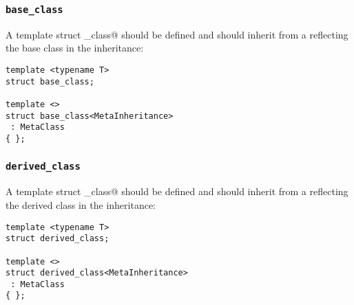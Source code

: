 \subsubsection{\texttt{base\_class}}

A template struct \verb@base_class@ should be defined and should inherit from
a  reflecting the base class in the inheritance:

\begin{verbatim}
template <typename T>
struct base_class;

template <>
struct base_class<MetaInheritance>
 : MetaClass
{ };
\end{verbatim}

\subsubsection{\texttt{derived\_class}}

A template struct \verb@derived_class@ should be defined and should inherit from
a  reflecting the derived class in the inheritance:

\begin{verbatim}
template <typename T>
struct derived_class;

template <>
struct derived_class<MetaInheritance>
 : MetaClass
{ };
\end{verbatim}

